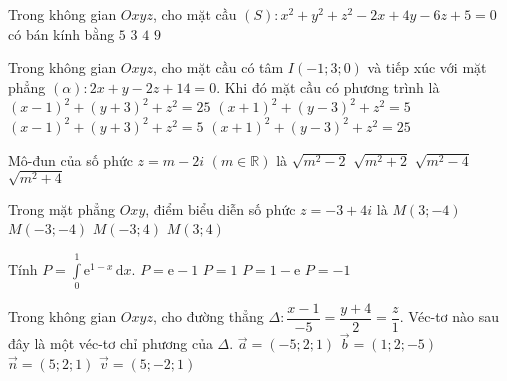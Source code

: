 \begin{ex}%
	Trong không gian $Oxyz$, cho mặt cầu $(S) \colon x^2+y^2+z^2-2x+4y-6z+5=0$ có bán kính bằng
	\choice
	{$5$}
	{\True $3$}
	{$4$}
	{$9$}
\end{ex}
\begin{ex}%
	Trong không gian $Oxyz$, cho mặt cầu có tâm $I(-1;3;0)$ và tiếp xúc với mặt phẳng $\left(\alpha \right) \colon 2x+y-2z+14=0$. Khi đó mặt cầu có phương trình là
	\choice
	{$(x-1)^2+(y+3)^2+z^2=25$}
	{$(x+1)^2+(y-3)^2+z^2=5$}
	{$(x-1)^2+(y+3)^2+z^2=5$}
	{\True $(x+1)^2+(y-3)^2+z^2=25$}
\end{ex}
\begin{ex}%
	Mô-đun của số phức $z=m-2i$ $\left(m\in \mathbb{R}\right)$ là
	\choice
	{$\sqrt{m^2-2}$}
	{$\sqrt{m^2+2}$}
	{$\sqrt{m^2-4}$}
	{\True $\sqrt{m^2+4}$}
\end{ex}
\begin{ex}%
	Trong mặt phẳng $Oxy$, điểm biểu diễn số phức $z=-3+4i$ là
	\choice
	{$M(3;-4)$}
	{$M(-3;-4)$}
	{\True $M(-3;4)$}
	{$M(3;4)$}
\end{ex}
\begin{ex}%
	Tính $P= \displaystyle\int\limits_0^1 \mathrm{e}^{1-x} \mathrm{\,d}x$.
	\choice
	{\True $P = \mathrm{e}-1$}
	{$P = 1$}
	{$P = 1-\mathrm{e}$}
	{$P = -1$}
\end{ex}
\begin{ex}%
	Trong không gian $Oxyz$, cho đường thẳng $\Delta \colon \dfrac{x-1}{-5}=\dfrac{y+4}{2}=\dfrac{z}{1}$. Véc-tơ nào sau đây là một véc-tơ chỉ phương của $\Delta$.
	\choice
	{\True $\overrightarrow{a}=\left(-5;2;1\right)$}
	{$\overrightarrow{b}=\left(1;2;-5\right)$}
	{$\overrightarrow{n}=\left(5;2;1\right)$}
	{$\overrightarrow{v}=\left(5;-2;1\right)$}
\end{ex}
